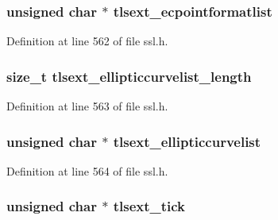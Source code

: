 \subsubsection[{\texorpdfstring{tlsext\+\_\+ecpointformatlist}{tlsext_ecpointformatlist}}]{\setlength{\rightskip}{0pt plus 5cm}unsigned char $\ast$ tlsext\+\_\+ecpointformatlist}\hypertarget{structssl__session__st_aed6a4a471306c6c96e1052966ed5b4cd}{}\label{structssl__session__st_aed6a4a471306c6c96e1052966ed5b4cd}


Definition at line 562 of file ssl.\+h.

\subsubsection[{\texorpdfstring{tlsext\+\_\+ellipticcurvelist\+\_\+length}{tlsext_ellipticcurvelist_length}}]{\setlength{\rightskip}{0pt plus 5cm}size\+\_\+t tlsext\+\_\+ellipticcurvelist\+\_\+length}\hypertarget{structssl__session__st_a51510574a1159a9fb5ab06bf323945c6}{}\label{structssl__session__st_a51510574a1159a9fb5ab06bf323945c6}


Definition at line 563 of file ssl.\+h.

\subsubsection[{\texorpdfstring{tlsext\+\_\+ellipticcurvelist}{tlsext_ellipticcurvelist}}]{\setlength{\rightskip}{0pt plus 5cm}unsigned char $\ast$ tlsext\+\_\+ellipticcurvelist}\hypertarget{structssl__session__st_afc8968e1fcae3767abbb9b981dc0ac75}{}\label{structssl__session__st_afc8968e1fcae3767abbb9b981dc0ac75}


Definition at line 564 of file ssl.\+h.

\subsubsection[{\texorpdfstring{tlsext\+\_\+tick}{tlsext_tick}}]{\setlength{\rightskip}{0pt plus 5cm}unsigned char $\ast$ tlsext\+\_\+tick}\hypertarget{structssl__session__st_a5286c813979ec36669b3d1065267fdb1}{}\label{structssl__session__st_a5286c813979ec36669b3d1065267fdb1}


